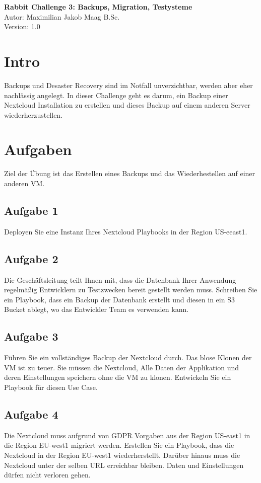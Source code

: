 \documentclass{article}
\begin{document}
    \begin{center}
        \Large \textbf{Rabbit Challenge 3: Backups, Migration, Testysteme} \\ [6pt]
        \normalsize
        Autor: Maximilian Jakob Maag B.Sc. \\
        Version: 1.0
    \end{center}

    \section{Intro}
    Backups und Desaster Recovery sind im Notfall unverzichtbar, werden aber eher nachlässig angelegt.
    In dieser Challenge geht es darum, ein Backup einer Nextcloud Installation zu erstellen und dieses Backup auf einem anderen Server wiederherzustellen.

    \section{Aufgaben}
    Ziel der Übung ist das Erstellen eines Backups und das Wiederhestellen auf einer anderen VM.

    \subsection{Aufgabe 1}
    Deployen Sie eine Instanz Ihres Nextcloud Playbooks in der Region US-eeast1.

    \subsection{Aufgabe 2}
    Die Geschäftsleitung teilt Ihnen mit, dass die Datenbank Ihrer Anwendung regelmäßig Entwicklern zu Testzwecken bereit gestellt werden muss.
    Schreiben Sie ein Playbook, dass ein Backup der Datenbank erstellt und diesen in ein S3 Bucket ablegt, wo das Entwickler Team es verwenden kann.

    \subsection{Aufgabe 3}
    Führen Sie ein vollständiges Backup der Nextcloud durch.
    Das blose Klonen der VM ist zu teuer. Sie müssen die Nextcloud, Alle Daten der Applikation und deren Einstellungen speichern ohne die VM zu klonen.
    Entwickeln Sie ein Playbook für diesen Use Case.

    \subsection{Aufgabe 4}
    Die Nextcloud muss aufgrund von GDPR Vorgaben aus der Region US-east1 in die Region EU-west1 migriert werden.
    Erstellen Sie ein Playbook, dass die Nextcloud in der Region EU-west1 wiederherstellt.
    Darüber hinaus muss die Nextcloud unter der selben URL erreichbar bleiben.
    Daten und Einstellungen dürfen nicht verloren gehen.
\end{document}
